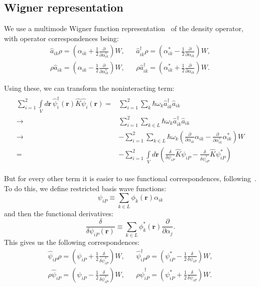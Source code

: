 \documentclass[12pt,notitlepage]{report}
\begin{document}
\subsection{Wigner representation}

We use a multimode Wigner function representation~\cite{gardiner_quantum_noise} of the density operator,
with operator correspondences being:
\begin{align*}
\hat{a}_{ik} \rho = \left( \alpha_{ik} + \frac{1}{2} \frac{\partial}{\partial \alpha_{ik}^*} \right) W, & &
\hat{a}_{ik}^\dagger \rho = \left( \alpha_{ik}^* - \frac{1}{2} \frac{\partial}{\partial \alpha_{ik}} \right) W, \\
\rho \hat{a}_{ik} = \left( \alpha_{ik} - \frac{1}{2} \frac{\partial}{\partial \alpha_{ik}^*} \right) W, & &
\rho \hat{a}_{ik}^\dagger = \left( \alpha_{ik}^* + \frac{1}{2} \frac{\partial}{\partial \alpha_{ik}} \right) W.
\end{align*}

Using these, we can transform the noninteracting term:
\begin{align*}
\begin{split}
\sum\limits^2_{i=1}\int\limits_V d\mathbf{r} \, \hat{\psi}_i^\dagger(\mathbf{r}) \hat{K} \hat{\psi}_i(\mathbf{r}) = &
\sum\limits_{i=1}^2 \sum\limits_k \hbar \omega_{k} \hat{a}_{ik}^\dagger \hat{a}_{ik} \\
\rightarrow {} & \sum\limits_{i=1}^2 \sum\limits_{k \in L} \hbar \omega_{k} \hat{a}_{ik}^\dagger \hat{a}_{ik} \\
\rightarrow {} & - \sum\limits_{i=1}^2 \sum\limits_{k \in L} \hbar \omega_k \left(
	\frac{\partial}{\partial \alpha_{ik}} \alpha_{ik} - \frac{\partial}{\partial \alpha_{ik}^*} \alpha_{ik}^*
\right) W \\
= {} & - \sum\limits_{i=1}^2 \int\limits_V d\mathbf{r} \left(
	\frac{\delta}{\delta \psi_{iP}} \hat{K} \psi_{iP} - \frac{\delta}{\delta \psi_{iP}^*} \hat{K} \psi_{iP}^*
\right)
\end{split}
\end{align*}

But for every other term it is easier to use functional correspondences, following~\cite{norrie_ballagh_gardiner_bradley_2006}.
To do this, we define restricted basis wave functions:
\[
\psi_{iP} \equiv \sum\limits_{k \in L} \phi_k (\mathbf{r}) \alpha_{ik}
\]
and then the functional derivatives:
\[
\frac{\delta}{\delta \psi_{iP} (\mathbf{r})} \equiv \sum\limits_{k \in L} \phi_k^* (\mathbf{r}) \frac{\partial}{\partial \alpha_j}.
\]
This gives us the following correspondences:
\begin{align*}
\hat{\psi}_{iP} \rho = \left( \psi_{iP} + \frac{1}{2} \frac{\delta}{\delta \psi_{iP}^*} \right) W, & &
\hat{\psi}_{iP}^\dagger \rho = \left( \psi_{iP}^* - \frac{1}{2} \frac{\delta}{\delta \psi_{iP}} \right) W, \\
\rho \hat{\psi}_{iP} = \left( \psi_{iP} - \frac{1}{2} \frac{\delta}{\delta \psi_{iP}^*} \right) W, & &
\rho \hat{\psi}_{iP}^\dagger = \left( \psi_{iP}^* + \frac{1}{2} \frac{\delta}{\delta \psi_{iP}} \right) W.
\end{align*}
\end{document}
